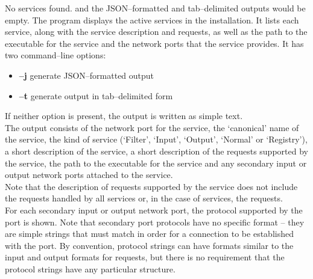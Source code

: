 \outputBegin{}
No services found.
\outputEnd{}
and the JSON--formatted and tab--delimited outputs would be empty.
The program  displays the active services in the \mplusm{}
installation.
It lists each service, along with the service description and requests, as well as the
path to the executable for the service and the \yarp{} network ports that the service
provides.
It has two command--line options:
\begin{itemize}
\item \textbf{--j} generate JSON--formatted output
\item \textbf{--t} generate output in tab--delimited form
\end{itemize}
If neither option is present, the output is written as simple text.\\

The output consists of the \yarp{} network port for the service, the `canonical' name of
the service, the kind of service (`Filter', `Input', `Output', `Normal' or `Registry'), a
short description of the service, a short description of the requests supported by the
service, the path to the executable for the service and any secondary input or output
\yarp{} network ports attached to the service.\\

Note that the description of requests supported by the service does not include the
 requests handled by all services or, in the case of
 services, the 
requests.\\

For each secondary input or output \yarp{} network port, the protocol supported by the
port is shown.
Note that secondary port protocols have no specific format -- they are simple strings that
must match in order for a connection to be established with the port.
By convention, protocol strings can have formats similar to the input and output formats
for requests, but there is no requirement that the protocol strings have any particular
structure.\\

